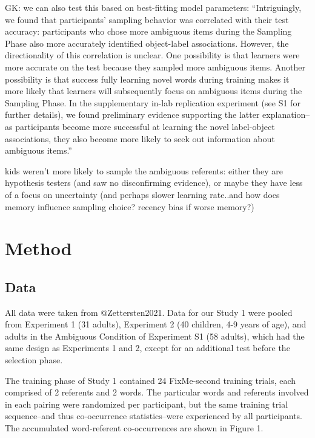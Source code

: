 \documentclass[10pt, letterpaper]{article}
\begin{document}
GK: we can also test this based on best-fitting model parameters:
``Intriguingly, we found that participants' sampling behavior was
correlated with their test accuracy: participants who chose more
ambiguous items during the Sampling Phase also more accurately
identified object-label associations. However, the directionality of
this correlation is unclear. One possibility is that learners were more
accurate on the test because they sampled more ambiguous items. Another
possibility is that success fully learning novel words during training
makes it more likely that learners will subsequently focus on ambiguous
items during the Sampling Phase. In the supplementary in-lab replication
experiment (see S1 for further details), we found preliminary evidence
supporting the latter explanation-- as participants become more
successful at learning the novel label-object associations, they also
become more likely to seek out information about ambiguous items.''

kids weren't more likely to sample the ambiguous referents: either they
are hypothesis testers (and saw no disconfirming evidence), or maybe
they have less of a focus on uncertainty (and perhaps slower learning
rate..and how does memory influence sampling choice? recency bias if
worse memory?)

\section{Method}\label{method}

\subsection{Data}\label{data}

All data were taken from @Zettersten2021. Data for our Study 1 were
pooled from Experiment 1 (31 adults), Experiment 2 (40 children, 4-9
years of age), and adults in the Ambiguous Condition of Experiment S1
(58 adults), which had the same design as Experiments 1 and 2, except
for an additional test before the selection phase.

The training phase of Study 1 contained 24 FixMe-second training trials,
each comprised of 2 referents and 2 words. The particular words and
referents involved in each pairing were randomized per participant, but
the same training trial sequence--and thus co-occurrence
statistics--were experienced by all participants. The accumulated
word-referent co-occurrences are shown in Figure 1.
\end{document}
